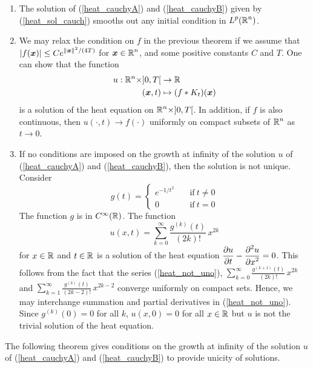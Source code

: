 \begin{rmkList} \label{heat_smooth_sol}
\begin{enumerate}
\item The solution of (\ref{heat_cauchyA}) and (\ref{heat_cauchyB}) given by
(\ref{heat_sol_cauch}) smooths out any initial condition in
$\displaystyle L^p(\mathbb{R}^n)$.
\item We may relax the condition on $f$ in the previous theorem if we assume
that $\displaystyle |f({\bm{x}})| \leq C e^{\|{\bm{x}}\|^2/(4T)}$ for
$\displaystyle {\bm{x}} \in \mathbb{R}^n$, and some positive constants $C$ and
$T$.  One can show that the function
\begin{align*}
u: \mathbb{R}^n \times ]0,T[ &\rightarrow \mathbb{R} \\
({\bm{x}}, t) &\mapsto (f\ast K_t)({\bm{x}})
\end{align*}
is a solution of the heat equation on $\displaystyle \mathbb{R}^n \times ]0,T[$.  In
addition, if $f$ is also continuous, then
$u(\cdot,t) \rightarrow f(\cdot)$ uniformly on compact subsets of
$\displaystyle \mathbb{R}^n$ as $t\rightarrow 0$.
\item If no conditions are imposed on the growth at infinity of the
solution $u$ of (\ref{heat_cauchyA}) and (\ref{heat_cauchyB}), then
the solution is not unique.  Consider
\[
g(t) =
\begin{cases}
e^{-1/t^2} & \quad \text{if} \ t\neq 0 \\
0 & \quad \text{if} \ t=0
\end{cases}
\]
The function $g$ is in $C^\infty(\mathbb{R})$.  The function
\begin{equation} \label{heat_not_uno}
u(x,t) = \sum_{k=0}^\infty \frac{g^{(k)}(t)}{(2k)!}\,x^{2k}
\end{equation}
for $x\in \mathbb{R}$ and  $t\in \mathbb{R}$ is a solution of the heat equation
$\displaystyle \frac{\partial{u}}{\partial t} - \frac{\displaystyle \partial^{2}{u}} {\displaystyle \partial x^{2}} = 0$.  This follows
from the fact that the series (\ref{heat_not_uno}),
$\displaystyle \sum_{k=0}^\infty \frac{g^{(k+1)}(t)}{(2k)!}\,x^{2k}$
and $\displaystyle \sum_{k=1}^\infty \frac{g^{(k)}(t)}{(2k-2)!}\,x^{2k-2}$
converge uniformly on compact sets.  Hence, we may interchange
summation and partial derivatives in (\ref{heat_not_uno}). 
Since $g^{(k)}(0)=0$ for all $k$, $u(x,0)=0$ for all
$x\in \mathbb{R}$ but $u$ is not the trivial solution of the heat equation.
\end{enumerate}
\end{rmkList}

The following theorem gives conditions on the growth at infinity of
the solution $u$ of (\ref{heat_cauchyA}) and (\ref{heat_cauchyB}) to
provide unicity of solutions.

